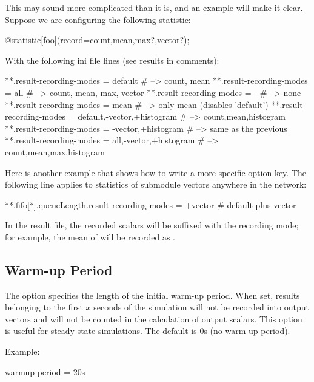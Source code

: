 This may sound more complicated than it is, and an example will make it clear.
Suppose we are configuring the following statistic:

\begin{ned}
@statistic[foo](record=count,mean,max?,vector?);
\end{ned}

With the following ini file lines (see results in comments):

\begin{inifile}
**.result-recording-modes = default  # --> count, mean
**.result-recording-modes = all      # --> count, mean, max, vector
**.result-recording-modes = -        # --> none
**.result-recording-modes = mean     # --> only mean (disables 'default')
**.result-recording-modes = default,-vector,+histogram # --> count,mean,histogram
**.result-recording-modes = -vector,+histogram         # --> same as the previous
**.result-recording-modes = all,-vector,+histogram  # --> count,mean,max,histogram
\end{inifile}

Here is another example that shows how to write a more specific option key. The
following line applies to  statistics of  submodule
vectors anywhere in the network:

\begin{inifile}
**.fifo[*].queueLength.result-recording-modes = +vector  # default plus vector
\end{inifile}

In the result file, the recorded scalars will be suffixed with the recording
mode; for example, the mean of  will be recorded as
.

\subsection{Warm-up Period}
\label{sec:ana-sim:warmup-period}

The  option specifies the length of the initial warm-up
period. When set, results belonging to the first $x$ seconds of the simulation
will not be recorded into output vectors and will not be counted in the
calculation of output scalars. This option is useful for steady-state
simulations. The default is 0s (no warm-up period).

Example:

\begin{inifile}
warmup-period = 20s
\end{inifile}


